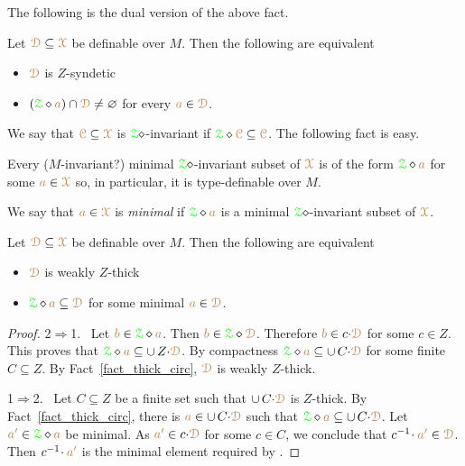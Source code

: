The following is the dual version of the above fact.

\begin{fact}
  Let $\mrD\subseteq\mrX$ be definable over $M$.
  Then the following are equivalent
  \begin{itemize}
    \item [1.] $\mrD$ is $Z$-syndetic
    \item [2.] $(\grZ\diamond {\mr a})\cap\mrD\neq\varnothing$ for every ${\mr a}\in\mrD$.
  \end{itemize}
\end{fact}

We say that $\mrC\subseteq\mrX$ is $\grZ{\diamond}$-invariant if $\grZ\diamond\mrC\subseteq\mrC$.
The following fact is easy.

\begin{fact}
  Every ($M$-invariant?) minimal $\grZ{\diamond}$-invariant subset of $\mrX$ is of the form $\grZ\diamond {\mr a}$ for some ${\mr a}\in\mrX$ so, in particular, it is type-definable over $M$.
\end{fact}

We say that ${\mr a}\in\mrX$ is \emph{minimal\/} if $\grZ\diamond {\mr a}$ is a minimal $\grZ{\diamond}$-invariant subset of $\mrX$.

\begin{theorem}
  Let $\mrD\subseteq\mrX$ be definable over $M$.
  Then the following are equivalent
  \begin{itemize}
    \item [1.] $\mrD$ is weakly $Z$-thick
    \item [2.] $\grZ\diamond {\mr a}\subseteq\mrD$ for some minimal ${\mr a}\in\mrD$.
  \end{itemize}
\end{theorem}

\begin{proof}
  2$\Rightarrow$1. \ 
  Let ${\mr b}\in\grZ\diamond {\mr a}$.
  Then ${\mr b}\in\grZ\diamond\mrD$.
  Therefore ${\mr b}\in c{\cdot}\mrD$ for some $c\in Z$.
  This proves that $\grZ\diamond {\mr a}\subseteq\cup\,Z{\cdot}\mrD$.
  By compactness $\grZ\diamond {\mr a}\subseteq\cup\,C{\cdot}\mrD$ for some finite $C\subseteq Z$.
  By Fact~\ref{fact_thick_circ}, $\mrD$ is weakly $Z$-thick.

  1$\Rightarrow$2. \ 
  Let $C\subseteq Z$ be a finite set such that $\cup\,C{\cdot}\mrD$ is $Z$-thick.
  By Fact~\ref{fact_thick_circ}, there is ${\mr a}\in\cup\,C{\cdot}\mrD$ such that $\grZ\diamond {\mr a}\subseteq\cup\,C{\cdot}\mrD$.
  Let ${\mr a'}\in\grZ\diamond {\mr a}$ be minimal.
  As ${\mr a'}\in c{\cdot}\mrD$ for some $c\in C$, we conclude that $c^{-1}\!\cdot {\mr a'}\in\mrD$.
  Then $c^{-1}\!\cdot {\mr a'}$ is the minimal element required by .
\end{proof}

